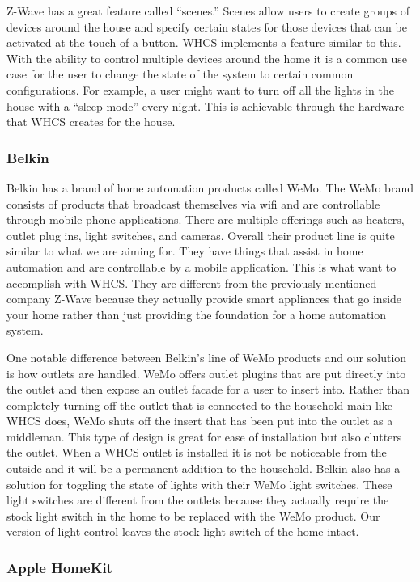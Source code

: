{\color{black}
Z{}-Wave has a great feature called {}``scenes.'' Scenes allow users to create groups of devices around the house and
specify certain states for those devices that can be activated at the touch of a button. WHCS implements a
feature similar to this. With the ability to control multiple devices around the home it is a common use case for
the user to change the state of the system to certain common configurations. For example, a user might want to turn off
all the lights in the house with a {}``sleep mode{}'' every night. This is achievable through the hardware that
WHCS creates for the house.}

\subsubsection{Belkin}
Belkin has a brand of home automation products called WeMo. The WeMo brand
consists of products that broadcast themselves via wifi and are controllable
through mobile phone applications. There are multiple offerings such as
heaters, outlet plug ins, light switches, and cameras. Overall their product
line is quite similar to what we are aiming for. They have things that assist
in home automation and are controllable by a mobile application. This is what
want to accomplish with WHCS. They are different from the previously mentioned
company Z{}-Wave because they actually provide smart appliances that go inside
your home rather than just providing the foundation for a home automation
system.

One notable difference between Belkin{}'s line of WeMo products
and our solution is how outlets are handled. WeMo offers outlet plugins that
are put directly into the outlet and then expose an outlet facade for a user to
insert into. Rather than completely turning off the outlet that is connected to
the household main like WHCS does, WeMo shuts off the insert that has
been put into the outlet as a middleman. This type of design is great for ease
of installation but also clutters the outlet. When a WHCS outlet is installed
it is not be noticeable from the outside and it will be a permanent addition
to the household. Belkin also has a solution for toggling the state of lights
with their WeMo light switches. These light switches are different from the
outlets because they actually require the stock light switch in the home to be
replaced with the WeMo product. Our version of light control leaves the
stock light switch of the home intact.

\subsubsection{Apple HomeKit}

